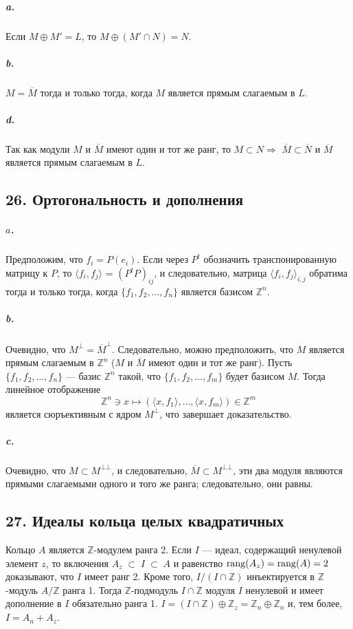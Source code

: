 {\subparagraph{a.} Если $M \oplus M' = L$, то $M \oplus (M' \cap N) = N$.

\subparagraph{b.} $M = \overline{M}$ тогда и только тогда, когда $M$ является прямым слагаемым в $L$.




\subparagraph{d.} Так как модули $M$ и $\overline{M}$ имеют один и тот же ранг, то $M \subset N \Rightarrow$
$\overline{M} \subset \overline{N}$ и $\overline{M}$ является прямым слагаемым в $L$.

\subsection{\normalsize{26. Ортогональность и дополнения}}

\subparagraph{$a$.} Предположим, что $f_{i} = P(e_{i})$. Если через $P^{t}$ обозначить транспонированную матрицу к $P$, то $\langle f_{i},f_{j} \rangle$ = $(P^{t}P)_{ij}$, и следовательно, матрица $\langle f_{i},f_{j} \rangle_{i,j}$ обратима тогда и только тогда, когда $\{f_{1},f_{2},\ldots,f_{n}\}$
является базисом $\mathbb {Z}^{n}$.

\subparagraph{b.} Очевидно, что $M^{\bot} = \overline{M}^{\bot}$. Следовательно, можно предположить,
что $M$ является прямым слагаемым в $\mathbb {Z}^{n}$ ($M$ и $\overline{M}$ имеют один и тот
же ранг). Пусть $\{f_{1},f_{2},\ldots,f_{n}\}$ --- базис $\mathbb {Z}^{n}$ такой, что $\{f_{1},f_{2},\ldots,f_{m}\}$
будет базисом $M$. Тогда линейное отображение
\begin{equation*}
\mathbb {Z}^{n} \ni x \mapsto (\langle x,f_{1} \rangle,\ldots,\langle x,f_{m} \rangle) \in \mathbb {Z}^{m}
\end{equation*}
является сюръективным с ядром $M^{\bot}$, что завершает доказательство.
\subparagraph{c.} Очевидно, что $M \subset M^{\bot\bot}$, и следовательно, $\overline{M} \subset M^{\bot\bot}$, эти два
модуля являются прямыми слагаемыми одного и того же ранга; следовательно, они равны.

\subsection{\normalsize{27. Идеалы кольца целых квадратичных}}

Кольцо $A$ является $\mathbb {Z}$-модулем ранга 2. Если $I$ --- идеал, содержащий ненулевой элемент $z$, то включения $A_{z} \;\subset\; I \;\subset\; A$ и равенство\linebreak
${\rm rang} (A_{z}) = {\rm rang} (A) = 2$ доказывают, что $I$ имеет ранг 2. Кроме того,
$I/(I\cap\mathbb {Z})$ инъектируется в $\mathbb {Z}$-модуль $A/\mathbb {Z}$ ранга 1. Тогда $\mathbb {Z}$-подмодуль
$I\cap\mathbb {Z}$ модуля $I$ ненулевой и имеет дополнение в $I$ обязательно ранга 1.\linebreak
$I = (I\cap\mathbb {Z}) \oplus \mathbb {Z}_{z} = \mathbb {Z}_{n} \oplus \mathbb {Z}_{n}$ и, тем более, $I = A_{n} + A_{z}$.

}

